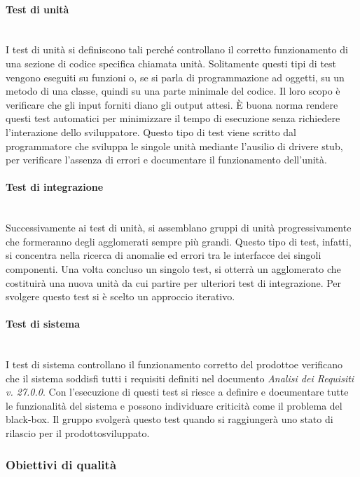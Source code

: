 \paragraph*{Test di unità} \mbox{}\\ [1mm]
I test di unità si definiscono tali perché controllano il corretto funzionamento di una sezione di codice specifica chiamata unità. Solitamente questi tipi di test vengono eseguiti su funzioni o, se si parla di programmazione ad oggetti, su un metodo di una classe, quindi su una parte minimale del codice. Il loro scopo è verificare che gli input forniti diano gli output attesi. È buona norma rendere questi test automatici per minimizzare il tempo di esecuzione senza richiedere l'interazione dello sviluppatore. Questo tipo di test viene scritto dal programmatore che sviluppa le singole unità mediante l'ausilio di driver\glosp e stub\glo, per verificare l'assenza di errori e documentare il funzionamento dell'unità.

\paragraph*{Test di integrazione} \mbox{}\\ [1mm]
Successivamente ai test di unità, si assemblano gruppi di unità progressivamente che formeranno degli agglomerati sempre più grandi. Questo tipo di test, infatti, si concentra nella ricerca di anomalie ed errori tra le interfacce dei singoli componenti. Una volta concluso un singolo test, si otterrà un agglomerato che costituirà una nuova unità da cui partire per ulteriori test di integrazione. Per svolgere questo test si è scelto un approccio iterativo.

\paragraph*{Test di sistema} \mbox{}\\ [1mm]
I test di sistema controllano il funzionamento corretto del prodotto\glosp e verificano che il sistema soddisfi tutti i requisiti definiti nel documento \textit{Analisi dei Requisiti v. 27.0.0}. Con l'esecuzione di questi test si riesce a definire e documentare tutte le funzionalità del sistema e possono individuare criticità come il problema del black-box\glo. Il gruppo svolgerà questo test quando si raggiungerà uno stato di rilascio per il prodotto\glosp sviluppato.

\subsubsection{Obiettivi di qualità}

